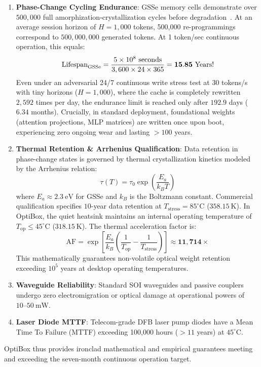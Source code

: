 \documentclass[11pt,a4paper]{report}
\begin{document}
\begin{enumerate}
\item \textbf{Phase-Change Cycling Endurance}: GSSe memory cells demonstrate over $500,000$ full amorphization-crystallization cycles before degradation~\cite{Meng2023}. At an average session horizon of $H = 1,000$ tokens, 500,000 re-programmings correspond to $500,000,000$ generated tokens. At 1 token/sec continuous operation, this equals:
\begin{equation}
\text{Lifespan}_{\rm GSSe} = \frac{5 \times 10^8~\text{seconds}}{3,600 \times 24 \times 365} = \mathbf{15.85~\text{Years}}!
\end{equation}
Even under an adversarial 24/7 continuous write stress test at 30 tokens/s with tiny horizons ($H = 1,000$), where the cache is completely rewritten $2,592$ times per day, the endurance limit is reached only after $192.9$ days ($6.34$ months). Crucially, in standard deployment, foundational weights (attention projections, MLP matrices) are written once upon boot, experiencing zero ongoing wear and lasting $>100$ years.

\item \textbf{Thermal Retention \& Arrhenius Qualification}: Data retention in phase-change states is governed by thermal crystallization kinetics modeled by the Arrhenius relation:
\begin{equation}
\tau(T) = \tau_0 \exp\left(\frac{E_a}{k_B T}\right)
\end{equation}
where $E_a \approx 2.3~\text{eV}$ for GSSe and $k_B$ is the Boltzmann constant. Commercial qualification specifies $10$-year data retention at $T_{\text{stress}} = 85^\circ\text{C}$ ($358.15~\text{K}$). In OptiBox, the quiet heatsink maintains an internal operating temperature of $T_{\text{op}} \le 45^\circ\text{C}$ ($318.15~\text{K}$). The thermal acceleration factor is:
\begin{equation}
\text{AF} = \exp\left[\frac{E_a}{k_B}\left(\frac{1}{T_{\text{op}}} - \frac{1}{T_{\text{stress}}}\right)\right] \approx \mathbf{11,714\times}
\end{equation}
This mathematically guarantees non-volatile optical weight retention exceeding $10^5$ years at desktop operating temperatures.

\item \textbf{Waveguide Reliability}: Standard SOI waveguides and passive couplers undergo zero electromigration or optical damage at operational powers of $10\text{--}50~\text{mW}$.
\item \textbf{Laser Diode MTTF}: Telecom-grade DFB laser pump diodes have a Mean Time To Failure (MTTF) exceeding 100,000 hours ($>11$ years) at $45^\circ\text{C}$.
\end{enumerate}
OptiBox thus provides ironclad mathematical and empirical guarantees meeting and exceeding the seven-month continuous operation target.
\end{document}
